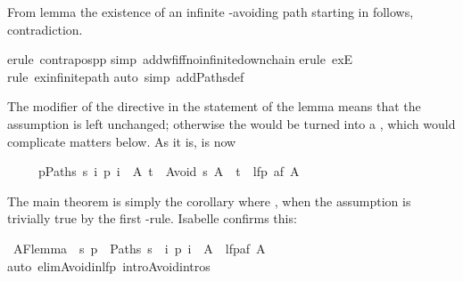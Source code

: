 \begin{isabellebody}
\begin{isamarkuptxt}
\begin{isabelle}
\end{isabelle}
From lemma  the existence of an infinite
-avoiding path starting in  follows, contradiction.%
\end{isamarkuptxt}%
\isamarkuptrue%
erule\ contrapos{\isacharunderscore}pp{\isacharparenright}\isanewline
\isamarkupfalse%
simp\ add{\isacharcolon}wf{\isacharunderscore}iff{\isacharunderscore}no{\isacharunderscore}infinite{\isacharunderscore}down{\isacharunderscore}chain{\isacharparenright}\isanewline
\isamarkupfalse%
erule\ exE{\isacharparenright}\isanewline
\isamarkupfalse%
rule\ ex{\isacharunderscore}infinite{\isacharunderscore}path{\isacharparenright}\isanewline
\isamarkupfalse%
auto\ simp\ add{\isacharcolon}Paths{\isacharunderscore}def{\isacharparenright}\isanewline
\isamarkupfalse%
\isamarkupfalse%
%
\begin{isamarkuptext}%
The  modifier of the  directive in the
statement of the lemma means
that the assumption is left unchanged; otherwise the  
would be turned
into a , which would complicate matters below. As it is,
 is now
\begin{isabelle}%
\ \ \ \ \ {\isasymlbrakk}{\isasymforall}p{\isasymin}Paths\ s{\isachardot}\ {\isasymexists}i{\isachardot}\ p\ i\ {\isasymin}\ A{\isacharsemicolon}\ t\ {\isasymin}\ Avoid\ s\ A{\isasymrbrakk}\ {\isasymLongrightarrow}\ t\ {\isasymin}\ lfp\ {\isacharparenleft}af\ A{\isacharparenright}%
\end{isabelle}
The main theorem is simply the corollary where ,
when the assumption  is trivially true
by the first -rule. Isabelle confirms this:%
%
\end{isamarkuptext}%
\isamarkuptrue%
\ AF{\isacharunderscore}lemma{}{\isacharcolon}\ \ {\isachardoublequote}{\isacharbraceleft}s{\isachardot}\ {\isasymforall}p\ {\isasymin}\ Paths\ s{\isachardot}\ {\isasymexists}\ i{\isachardot}\ p\ i\ {\isasymin}\ A{\isacharbraceright}\ {\isasymsubseteq}\ lfp{\isacharparenleft}af\ A{\isacharparenright}{\isachardoublequote}\isanewline
\isamarkupfalse%
auto\ elim{\isacharcolon}Avoid{\isacharunderscore}in{\isacharunderscore}lfp\ intro{\isacharcolon}Avoid{\isachardot}intros{\isacharparenright}\isanewline
\isanewline
\isamarkupfalse%
\isamarkupfalse%
\end{isabellebody}%
